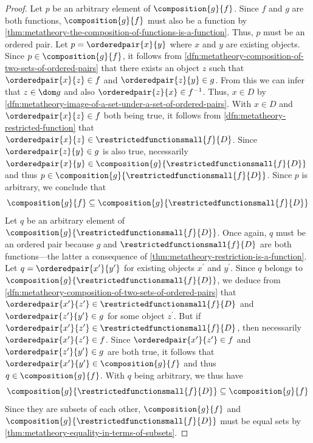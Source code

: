 \begin{proof}
    Let \( p \) be an arbitrary element of \( \composition{g}{f} \).
    Since \( f \) and \( g \) are both functions, \( \composition{g}{f} \) must also be a function by \cref{thm:metatheory-the-composition-of-functions-is-a-function}.
    Thus, \( p \) must be an ordered pair.
    Let \( p = \orderedpair{x}{y} \) where \( x \) and \( y \) are existing objects.
    Since \( p \in \composition{g}{f} \), it follows from \cref{dfn:metatheory-composition-of-two-sets-of-ordered-pairs} that
    there exists an object \( z \) such that \( \orderedpair{x}{z} \in f \) and \( \orderedpair{z}{y} \in g \).
    From this we can infer that \( z \in \dom g \) and also \( \orderedpair{z}{x} \in f^{-1} \).
    Thus, \( x \in D \) by \cref{dfn:metatheory-image-of-a-set-under-a-set-of-ordered-pairs}.
    With \( x \in D \) and \( \orderedpair{x}{z} \in f \) both being true, it follows from \cref{dfn:metatheory-restricted-function} that
    \( \orderedpair{x}{z} \in \restrictedfunctionsmall{f}{D} \).
    Since \( \orderedpair{z}{y} \in g \) is also true, necessarily \( \orderedpair{x}{y} \in \composition{g}{ \restrictedfunctionsmall{f}{D} } \)
    and thus \( p \in \composition{g}{ \restrictedfunctionsmall{f}{D} } \).
    Since \( p \) is arbitrary, we conclude that
    \begin{equation*}
        \composition{g}{f} \subseteq \composition{g}{ \restrictedfunctionsmall{f}{D} }
    \end{equation*}
    Let \( q \) be an arbitrary element of \( \composition{g}{\restrictedfunctionsmall{f}{D}} \).
    Once again, \( q \) must be an ordered pair because \( g \) and \( \restrictedfunctionsmall{f}{D} \) are both functions---the latter a consequence
    of \cref{thm:metatheory-restriction-is-a-function}.
    Let \( q = \orderedpair{x^{\prime}}{y^{\prime}} \) for existing objects \( x^{\prime} \) and \( y^{\prime} \).
    Since \( q \) belongs to \( \composition{g}{ \restrictedfunctionsmall{f}{D} } \), we deduce from \cref{dfn:metatheory-composition-of-two-sets-of-ordered-pairs} that
    \( \orderedpair{x^{\prime}}{z^{\prime}} \in \restrictedfunctionsmall{f}{D} \) and \( \orderedpair{z^{\prime}}{y^{\prime}} \in g \) for some object \( z^{\prime} \).
    But if \( \orderedpair{x^{\prime}}{z^{\prime}} \in \restrictedfunctionsmall{f}{D} \), then necessarily \( \orderedpair{x^{\prime}}{z^{\prime}} \in f \).
    Since \( \orderedpair{x^{\prime}}{z^{\prime}} \in f \) and \( \orderedpair{z^{\prime}}{y^{\prime}} \in g \) are both true,
    it follows that \( \orderedpair{x^{\prime}}{y^{\prime}} \in \composition{g}{f} \) and thus \( q \in \composition{g}{f} \).
    With \( q \) being arbitrary, we thus have
    \begin{equation*}
        \composition{g}{ \restrictedfunctionsmall{f}{D} } \subseteq \composition{g}{f}
    \end{equation*}
    Since they are subsets of each other, \( \composition{g}{f} \) and \( \composition{g}{ \restrictedfunctionsmall{f}{D} } \) must be equal sets
    by \cref{thm:metatheory-equality-in-terms-of-subsets}.
\end{proof}

